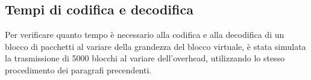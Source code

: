 \documentclass[italian, a4paper, 12pt]{article}
\begin{document}



%

\subsection{Tempi di codifica e decodifica}
Per verificare quanto tempo è necessario alla codifica e alla
decodifica di un blocco di pacchetti al variare della grandezza del
blocco virtuale, è stata simulata la trasmissione di 5000 blocchi al
variare dell'overhead, utilizzando lo stesso procedimento dei
paragrafi precendenti.
\end{document}
